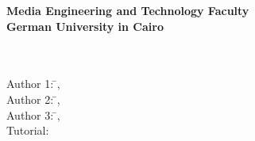 \newcommand{\titlePage}{

\thispagestyle{empty}
\begin{center}
  \textbf{Media Engineering and Technology Faculty}\\[1mm]
  \textbf{German University in Cairo}\\[1mm]
  
  \vspace{2cm}
  \doublespacing
  {\Huge \textbf{\titleOfThesisOne}}\\
  \singlespacing
  \vspace{2cm}
  {\large \textbf{\typeOfThesis}}\\
  
  \vfill
  \parbox{1cm}{
      \begin{large}
          \begin{tabbing}
            Author 1: \hspace{2cm}  
              \=\authorOfThesisOne, \idOne\\[2mm]
            Author 2: \hspace{2cm}  
              \=\authorOfThesisTwo, \idTwo\\[2mm]
            Author 3: \hspace{2cm}  
              \=\authorOfThesisThree, \idThree\\[2mm]
            Tutorial:  
              \>\tutorial\\[2mm]
          \end{tabbing}
      \end{large}
  }\\
\end{center}
\clearpage
}
\titlePage

\clearpage
